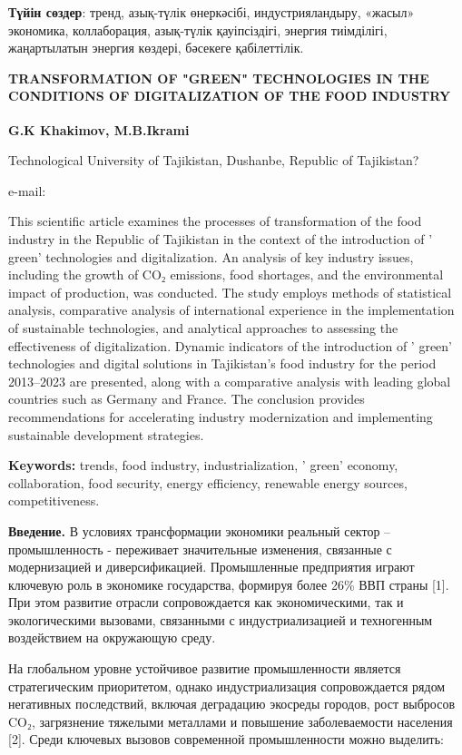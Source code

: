 {\bfseries Түйін сөздер}: тренд, азық-түлік өнеркәсібі, индустрияландыру,
«жасыл» экономика, коллаборация, азық-түлік қауіпсіздігі, энергия
тиімділігі, жаңартылатын энергия көздері, бәсекеге қабілеттілік.

{\bfseries TRANSFORMATION OF "GREEN" TECHNOLOGIES IN THE CONDITIONS OF
DIGITALIZATION OF THE FOOD INDUSTRY}

{\bfseries G.K Khakimov\textsuperscript{\envelope }, M.B.Ikrami}

Technological University of Tajikistan, Dushanbe, Republic of
Tajikistan?

e-mail:\href{mailto:gafurjon-68@mail.ru}{}

This scientific article examines the processes of transformation of the
food industry in the Republic of Tajikistan in the context of the
introduction of ' green'{} technologies
and digitalization. An analysis of key industry issues, including the
growth of CO₂ emissions, food shortages, and the environmental impact of
production, was conducted. The study employs methods of statistical
analysis, comparative analysis of international experience in the
implementation of sustainable technologies, and analytical approaches to
assessing the effectiveness of digitalization. Dynamic indicators of the
introduction of ' green'{} technologies
and digital solutions in Tajikistan's food industry for the period
2013--2023 are presented, along with a comparative analysis with leading
global countries such as Germany and France. The conclusion provides
recommendations for accelerating industry modernization and implementing
sustainable development strategies.

{\bfseries Keywords:} trends, food industry, industrialization,
' green'{} economy, collaboration, food
security, energy efficiency, renewable energy sources, competitiveness.

{\bfseries Введение.} В условиях трансформации экономики реальный сектор --
промышленность - переживает значительные изменения, связанные с
модернизацией и диверсификацией. Промышленные предприятия играют
ключевую роль в экономике государства, формируя более 26\% ВВП страны
{[}1{]}. При этом развитие отрасли сопровождается как экономическими,
так и экологическими вызовами, связанными с индустриализацией и
техногенным воздействием на окружающую среду.

На глобальном уровне устойчивое развитие промышленности является
стратегическим приоритетом, однако индустриализация сопровождается рядом
негативных последствий, включая деградацию экосреды городов, рост
выбросов CO₂, загрязнение тяжелыми металлами и повышение заболеваемости
населения {[}2{]}. Среди ключевых вызовов современной промышленности
можно выделить:

